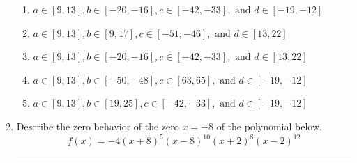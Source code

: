 \documentclass[14pt]{extbook}
\newcommand{\litem}[1]{\item#1\hspace*{-1cm}\rule{\textwidth}{0.4pt}}
\begin{document}
\begin{enumerate}
{\begin{enumerate}[label=\Alph*.]
\item \( a \in [9, 13], b \in [-20, -16], c \in [-42, -33], \text{ and } d \in [-19, -12] \)
\item \( a \in [9, 13], b \in [9, 17], c \in [-51, -46], \text{ and } d \in [13, 22] \)
\item \( a \in [9, 13], b \in [-20, -16], c \in [-42, -33], \text{ and } d \in [13, 22] \)
\item \( a \in [9, 13], b \in [-50, -48], c \in [63, 65], \text{ and } d \in [-19, -12] \)
\item \( a \in [9, 13], b \in [19, 25], c \in [-42, -33], \text{ and } d \in [-19, -12] \)

\end{enumerate} }
\litem{
Describe the zero behavior of the zero $x = -8$ of the polynomial below.\[ f(x) = -4(x + 8)^{5}(x - 8)^{10}(x + 2)^{8}(x - 2)^{12} \]\begin{enumerate}[label=\Alph*.]

\end{enumerate}}
\end{enumerate}
\end{document}
